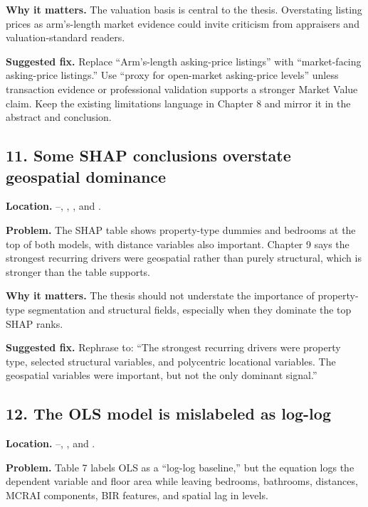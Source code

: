 \documentclass[11pt]{article}
\begin{document}
\textbf{Why it matters.} The valuation basis is central to the thesis. Overstating listing prices as arm's-length market evidence could invite criticism from appraisers and valuation-standard readers.

\textbf{Suggested fix.} Replace ``Arm's-length asking-price listings'' with ``market-facing asking-price listings.'' Use ``proxy for open-market asking-price levels'' unless transaction evidence or professional validation supports a stronger Market Value claim. Keep the existing limitations language in Chapter 8 and mirror it in the abstract and conclusion.

\subsection*{11. Some SHAP conclusions overstate geospatial dominance}

\textbf{Location.} --, , , and .

\textbf{Problem.} The SHAP table shows property-type dummies and bedrooms at the top of both models, with distance variables also important. Chapter 9 says the strongest recurring drivers were geospatial rather than purely structural, which is stronger than the table supports.

\textbf{Why it matters.} The thesis should not understate the importance of property-type segmentation and structural fields, especially when they dominate the top SHAP ranks.

\textbf{Suggested fix.} Rephrase to: ``The strongest recurring drivers were property type, selected structural variables, and polycentric locational variables. The geospatial variables were important, but not the only dominant signal.''

\subsection*{12. The OLS model is mislabeled as log-log}

\textbf{Location.} --, , and .

\textbf{Problem.} Table 7 labels OLS as a ``log-log baseline,'' but the equation logs the dependent variable and floor area while leaving bedrooms, bathrooms, distances, MCRAI components, BIR features, and spatial lag in levels.
\end{document}
